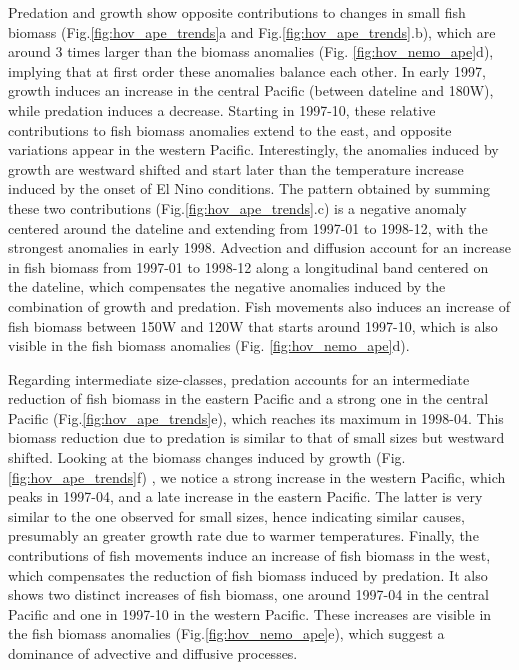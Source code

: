 Predation and growth show opposite contributions to changes in small fish biomass (Fig.\ref{fig:hov_ape_trends}a and Fig.\ref{fig:hov_ape_trends}.b), which are around 3 times larger than the biomass anomalies (Fig. \ref{fig:hov_nemo_ape}d), implying that at first order these anomalies balance each other. In early 1997, growth induces an increase in the central Pacific (between dateline and 180W), while predation induces a decrease. Starting in 1997-10, these relative contributions to fish biomass anomalies extend to the east, and opposite variations appear in the western Pacific. Interestingly, the anomalies induced by growth are westward shifted and start later than the temperature increase induced by the onset of El Nino conditions. The pattern obtained by summing these two contributions (Fig.\ref{fig:hov_ape_trends}.c) is a negative anomaly centered around the dateline and extending from 1997-01 to 1998-12, with the strongest anomalies in early 1998. Advection and diffusion account for an increase in fish biomass from 1997-01 to 1998-12 along a longitudinal band centered on the dateline, which compensates the negative anomalies induced by the combination of growth and predation. Fish movements also induces an increase of fish biomass between 150W and 120W that starts around 1997-10, which is also visible in the fish biomass anomalies (Fig. \ref{fig:hov_nemo_ape}d).

Regarding intermediate size-classes, predation accounts for an intermediate reduction of fish biomass in the eastern Pacific and a strong one in the central Pacific (Fig.\ref{fig:hov_ape_trends}e), which reaches its maximum in 1998-04. This biomass reduction due to predation is similar to that of small sizes but westward shifted. Looking at the biomass  changes induced by growth (Fig.\ref{fig:hov_ape_trends}f) , we notice a strong increase in the western Pacific, which peaks in 1997-04, and a late increase  in the eastern Pacific. The latter is very similar to the one observed for small sizes, hence indicating similar causes, presumably an greater growth rate due to warmer temperatures. Finally, the contributions of fish movements induce an increase of fish biomass in the west, which compensates the reduction of fish biomass induced by predation. It also shows two distinct increases of fish biomass, one around 1997-04 in the central Pacific and one in 1997-10 in the western Pacific. These increases are visible in the fish biomass anomalies (Fig.\ref{fig:hov_nemo_ape}e), which suggest a dominance of advective and diffusive processes.

